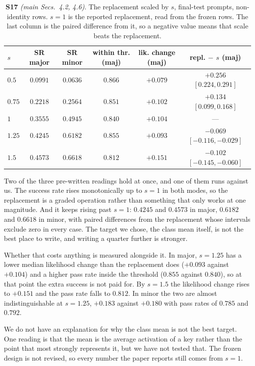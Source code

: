 \documentclass{article}
\begin{document}
\begin{table}[!t]
\centering
\caption{\textbf{S17} \textit{(main Secs.~4.2, 4.6)}. The replacement scaled by $s$,
final-test prompts, non-identity rows. $s=1$ is the reported replacement, read from the
frozen rows. The last column is the paired difference from it, so a negative value
means that scale beats the replacement.}
\label{tab:supp-scaled}
\footnotesize
\setlength{\tabcolsep}{3.5pt}
\begin{tabular}{@{}lccccc@{}}
\toprule
$s$ & SR major & SR minor & within thr. (maj) & lik. change (maj) & repl. $-$ $s$ (maj)\\
\midrule
$0.5$  & $0.0991$ & $0.0636$ & $0.866$ & $+0.079$ & $+0.256$ $[0.224,0.291]$\\
$0.75$ & $0.2218$ & $0.2564$ & $0.851$ & $+0.102$ & $+0.134$ $[0.099,0.168]$\\
$1$    & $0.3555$ & $0.4945$ & $0.840$ & $+0.104$ & ---\\
$1.25$ & $0.4245$ & $0.6182$ & $0.855$ & $+0.093$ & $-0.069$ $[-0.116,-0.029]$\\
$1.5$  & $0.4573$ & $0.6618$ & $0.812$ & $+0.151$ & $-0.102$ $[-0.145,-0.060]$\\
\bottomrule
\end{tabular}
\end{table}

Two of the three pre-written readings hold at once, and one of them runs against us.
The success rate rises monotonically up to $s=1$ in both modes, so the replacement is a
graded operation rather than something that only works at one magnitude. And it keeps
rising past $s=1$: $0.4245$ and $0.4573$ in major, $0.6182$ and $0.6618$ in minor, with
paired differences from the replacement whose intervals exclude zero in every case. The
target we chose, the class mean itself, is not the best place to write, and writing a
quarter further is stronger.

Whether that costs anything is measured alongside it. In major, $s=1.25$ has a lower
median likelihood change than the replacement does ($+0.093$ against $+0.104$) and a
higher pass rate inside the threshold ($0.855$ against $0.840$), so at that point the
extra success is not paid for. By $s=1.5$ the likelihood change rises to $+0.151$ and
the pass rate falls to $0.812$. In minor the two are almost indistinguishable at
$s=1.25$, $+0.183$ against $+0.180$ with pass rates of $0.785$ and $0.792$.

We do not have an explanation for why the class mean is not the best target. One reading
is that the mean is the average activation of a key rather than the point that most
strongly represents it, but we have not tested that. The frozen design is not revised,
so every number the paper reports still comes from $s=1$.
\end{document}
